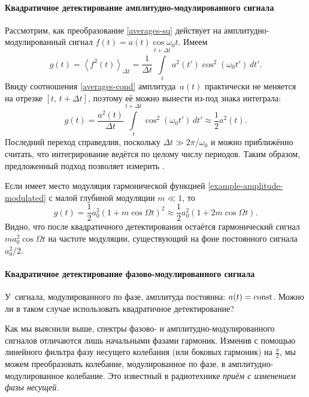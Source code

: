 \paragraph{Квадратичное детектирование амплитудно-модулированного сигнала}
Рассмотрим, как преобразование \eqref{averages-sq} действует на
амплитудно-модулированный сигнал $f(t) = a(t) \cos \omega_0 t$. Имеем
\begin{equation*}
 g(t) = \left<f^2(t)\right>_{\Delta t} =
 \frac{1}{\Delta t}
\int\limits_{t}^{t+\Delta t} a^2 (t') \cos^2(\omega_0 t')\,dt'.
\end{equation*}
Ввиду соотношения \eqref{averages-cond} амплитуда~$a(t)$ практически не меняется
на отрезке $[t,\,t+\Delta t]$, поэтому её можно вынести из-под знака интеграла:
\begin{equation}
 g(t)= \frac{a^2(t)}{\Delta t} \int\limits_{t}^{t+\Delta t} \cos^2(\omega_0 t')\,dt'\approx
 \frac12 a^2(t).
\end{equation}
Последний переход справедлив, поскольку $\Delta t \gg 2\pi/\omega_0$ и
можно приближённо считать, что интегрирование ведётся по целому числу периодов.
Таким образом, предложенный подход позволяет измерить 
.

Если имеет место модуляция гармонической функцией
\eqref{example-amplitude-modulated}
с малой глубиной модуляции $m\ll 1$, то
\begin{equation*}
 g(t) = \frac12 a_0^2 (1+m\cos\Omega t)^2 \approx
 \frac12 a_0^2 (1+2m\cos\Omega t).
\end{equation*}
Видно, что после квадратичного детектирования остаётся гармонический
сигнал $m a_0^2 \cos\Omega t$ на частоте модуляции, существующий на фоне
постоянного сигнала $a_0^2/2$.

\paragraph{Квадратичное детектирование фазово-модулированного сигнала}
У~сигнала, модулированного по фазе, амплитуда постоянна: $a(t)=\mathrm{const}$.
Можно ли в таком случае использовать квадратичное детектирование?

Как мы выяснили выше, спектры фазово- и амплитудно-модулированного сигналов
отличаются лишь начальными фазами гармоник. Изменив с помощью линейного фильтра
фазу несущего колебания (или боковых гармоник) на $\frac{\pi}{2}$,
мы можем преобразовать колебание, модулированное по фазе,
в амплитудно-модулированное колебание. Это известный в
радиотехнике \emph{приём с изменением фазы несущей}.

